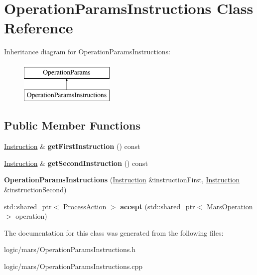 \hypertarget{classOperationParamsInstructions}{}\section{Operation\+Params\+Instructions Class Reference}
\label{classOperationParamsInstructions}
Inheritance diagram for Operation\+Params\+Instructions\+:\begin{figure}[H]
\begin{center}
\leavevmode
\includegraphics[height=2.000000cm]{classOperationParamsInstructions}
\end{center}
\end{figure}
\subsection*{Public Member Functions}
\begin{DoxyCompactItemize}
\item 
\mbox{\label{classOperationParamsInstructions_a49a28c36d1dc02e90f91394f05bd06ec}} 
\hyperlink{classInstruction}{Instruction} \& {\bfseries get\+First\+Instruction} () const
\item 
\mbox{\label{classOperationParamsInstructions_a27929107894c47204945f15a80b2e864}} 
\hyperlink{classInstruction}{Instruction} \& {\bfseries get\+Second\+Instruction} () const
\item 
\mbox{\label{classOperationParamsInstructions_a6e13df985bf378ead4a0db9164fb4a93}} 
{\bfseries Operation\+Params\+Instructions} (\hyperlink{classInstruction}{Instruction} \&instruction\+First, \hyperlink{classInstruction}{Instruction} \&instruction\+Second)
\item 
\mbox{\label{classOperationParamsInstructions_ada6b680039d0743fa1ff1a4e638c2301}} 
std\+::shared\+\_\+ptr$<$ \hyperlink{classProcessAction}{Process\+Action} $>$ {\bfseries accept} (std\+::shared\+\_\+ptr$<$ \hyperlink{classMarsOperation}{Mars\+Operation} $>$ operation)
\end{DoxyCompactItemize}


The documentation for this class was generated from the following files\+:\begin{DoxyCompactItemize}
\item 
logic/mars/Operation\+Params\+Instructions.\+h\item 
logic/mars/Operation\+Params\+Instructions.\+cpp\end{DoxyCompactItemize}
